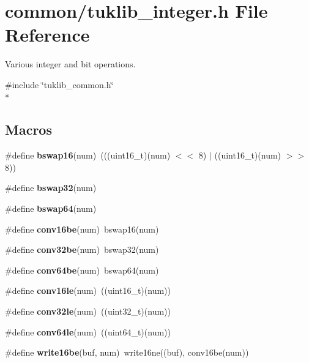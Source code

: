 \section{common/tuklib\-\_\-integer.h File Reference}
\label{tuklib__integer_8h}


Various integer and bit operations.  


{\ttfamily \#include \char`\"{}tuklib\-\_\-common.\-h\char`\"{}}\\*
\subsection*{Macros}
\begin{DoxyCompactItemize}
\item 
\#define {\bfseries bswap16}(num)~(((uint16\-\_\-t)(num) $<$$<$ 8) $|$ ((uint16\-\_\-t)(num) $>$$>$ 8))\label{tuklib__integer_8h_a9bc188ccb2085aca13b9e411db6bae11}

\item 
\#define {\bfseries bswap32}(num)
\item 
\#define {\bfseries bswap64}(num)
\item 
\#define {\bfseries conv16be}(num)~bswap16(num)\label{tuklib__integer_8h_a6b2b9d836ddb7dc5d299ead15101f57a}

\item 
\#define {\bfseries conv32be}(num)~bswap32(num)\label{tuklib__integer_8h_a812ae5d9be2d45d34f37744eb35c6ec4}

\item 
\#define {\bfseries conv64be}(num)~bswap64(num)\label{tuklib__integer_8h_a8ed018b58daffeb1bb83871cf4e09f2d}

\item 
\#define {\bfseries conv16le}(num)~((uint16\-\_\-t)(num))\label{tuklib__integer_8h_a3f517ab0a93d921fd78a2d0647ab906f}

\item 
\#define {\bfseries conv32le}(num)~((uint32\-\_\-t)(num))\label{tuklib__integer_8h_aaa18c21f5b341ddb6952b6b798be9795}

\item 
\#define {\bfseries conv64le}(num)~((uint64\-\_\-t)(num))\label{tuklib__integer_8h_a2cb6884e43cdd40bf5c5e67bebec7b27}

\item 
\#define {\bfseries write16be}(buf, num)~write16ne((buf), conv16be(num))\label{tuklib__integer_8h_a1f3fa212057250e94c915987ee6c3d0b}


\end{DoxyCompactItemize}
